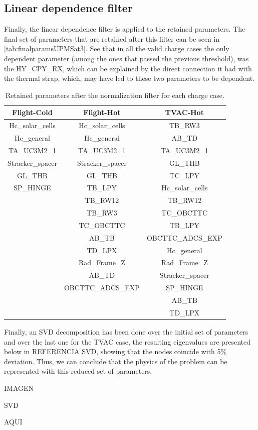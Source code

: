 \subsection{Linear dependence filter}
Finally, the linear dependence filter is applied to the retained parameters. The final set of parameters that are retained after this filter can be seen in \autoref{tab:finalparamsUPMSat3}. See that in all the valid charge cases the only dependent parameter (among the ones that passed the previous threshold), was the HY\_CPY\_RX, which can be explained by the direct connection it had with the thermal strap, which, may have led to these two parameters to be dependent.
\begin{table}[H]
    \centering
    \caption{Retained parameters after the normalization filter for each charge case.}
    \label{tab:finalparamsUPMSat3}
    \begin{tabular}{c c  c}
    \toprule
    \multicolumn{1}{c}{\textbf{Flight-Cold}} & \multicolumn{1}{c}{\textbf{Flight-Hot}}  & \multicolumn{1}{c}{\textbf{TVAC-Hot}} \\ \midrule
    Hc\_solar\_cells  & Hc\_solar\_cells  &  TB\_RW3  \\
    Hc\_general  & Hc\_general  &  AB\_TD  \\
    TA\_UC3M2\_1  & TA\_UC3M2\_1  &  TA\_UC3M2\_1  \\
    Stracker\_spacer  & Stracker\_spacer  &  GL\_THB  \\
    GL\_THB  & GL\_THB  &  TC\_LPY  \\
    SP\_HINGE  & TB\_LPY  &  Hc\_solar\_cells  \\
        & TB\_RW12  &  TB\_RW12  \\
        & TB\_RW3  &  TC\_OBCTTC  \\
        & TC\_OBCTTC  &  TB\_LPY  \\
        & AB\_TB  &  OBCTTC\_ADCS\_EXP  \\
        & TD\_LPX  &  Hc\_general  \\
        & Rad\_Frame\_Z  &  Rad\_Frame\_Z  \\
        & AB\_TD &  Stracker\_spacer  \\
        & OBCTTC\_ADCS\_EXP  &  SP\_HINGE  \\
        & & AB\_TB  \\
        & & TD\_LPX \\
        \bottomrule
    \end{tabular}
\end{table}

Finally, an SVD decomposition has been done over the initial set of parameters and over the last one for the TVAC case, the resulting eigenvalues are presented below in REFERENCIA SVD, showing that the nodes coincide with 5\% deviation. Thus, we can conclude that the physics of the problem can be represented with this reduced set of parameters.  

\begin{center}
    IMAGEN

SVD

AQUI
\end{center}